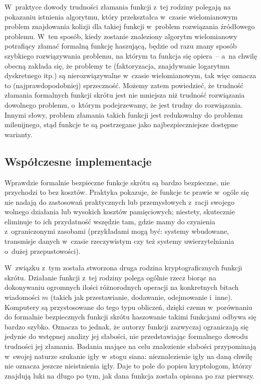 \documentclass[12pt,a4paper,twoside]{article}
\begin{document}
W~praktyce dowody trudności złamania funkcji z~tej rodziny polegają na
pokazaniu istnienia algorytmu, który przekształca w~czasie wielomianowym
problem znajdowania kolizji dla takiej funkcji w~problem rozwiązania źródłowego
problemu. W~ten sposób, kiedy zostanie znaleziony algorytm wielomianowy
potrafiący złamać formalną funkcję haszującą, będzie od razu znany sposób
szybkiego rozwiązywania problemu, na którym ta funkcja się opiera~-- a~na
chwilę obecną zakłada się, że problemy te (faktoryzacja, znajdywanie logarytmu
dyskretnego itp.) są nierozwiązywalne w~czasie wielomianowym, tak więc oznacza
to (najprawdopodobniej) sprzeczność. Możemy zatem powiedzieć, że trudność
złamania formalnych funkcji skrótu jest nie mniejsza niż trudność rozwiązania
dowolnego problemu, o~którym podejrzewamy, że jest trudny do rozwiązania.
Innymi słowy, problem złamania takich funkcji jest redukowalny do problemu
milenijnego, stąd funkcje te są postrzegane jako najbezpieczniejsze dostępne
warianty.



\subsection{Współczesne implementacje}
Wprawdzie formalnie bezpieczne funkcje skrótu są bardzo bezpieczne, nie
przychodzi to bez kosztów. Praktyka pokazuje, że funkcje te prawie w~ogóle się
nie nadają do zastosowań praktycznych lub przemysłowych z~racji swojego wolnego
działania lub wysokich kosztów pamięciowych; niestety, skutecznie eliminuje to
ich przydatność wszędzie tam, gdzie mamy do czynienia z~ograniczonymi zasobami
(przykładami mogą być: systemy wbudowane, transmisje danych w~czasie
rzeczywistym czy też systemy uwierzytelniania o~dużej przepustowości).

W~związku z~tym została stworzona druga rodzina kryptograficznych funkcji
skrótu. Działanie funkcji z~tej rodziny polega ogólnie rzecz biorąc na
dokonywaniu ogromnych ilości różnorodnych operacji na konkretnych bitach
wiadomości $m$ (takich jak przestawianie, dodawanie, odejmowanie i~inne).
Komputery są przystosowane do tego typu obliczeń, dzięki czemu w~porównaniu do
formalnie bezpiecznych funkcji skrótu haszowanie takimi funkcjami odbywa się
bardzo szybko. Oznacza to jednak, że autorzy funkcji zazwyczaj ograniczają się
jedynie do wstępnej analizy jej słabości,  nie przedstawiając
formalnego dowodu trudności jej złamania. Badania mające na celu znalezienie
słabości przypominają w~swojej naturze szukanie igły w~stogu siana:
nieznalezienie igły na daną chwilę nie oznacza jeszcze nieistnienia igły. Daje
to pole do popisu kryptologom, którzy znajdują luki na długo po tym, jak dana
funkcja została opisana po raz pierwszy.
\end{document}
